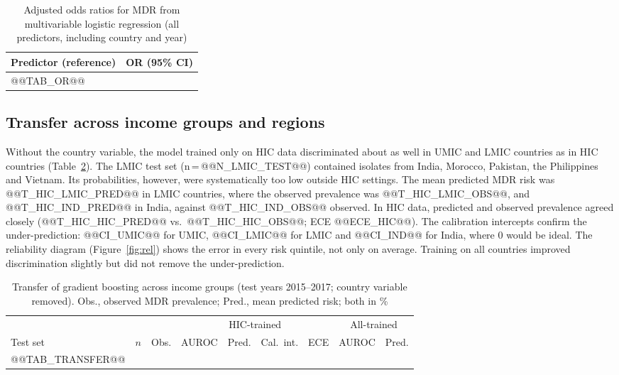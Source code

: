 \documentclass[11pt,a4paper]{article}
\begin{document}
\begin{table}[t]
\caption{Adjusted odds ratios for MDR from multivariable logistic regression (all predictors, including country and year)}\label{tab:or}
\centering\footnotesize
\begin{tabular}{lc}
\toprule
Predictor (reference) & OR (95\% CI) \\
\midrule
@@TAB_OR@@
\bottomrule
\end{tabular}
\end{table}

\subsection{Transfer across income groups and regions}
Without the country variable, the model trained only on HIC data discriminated about as well in UMIC and LMIC countries as in HIC countries (Table~\ref{tab:transfer}). The LMIC test set (n\,=\,@@N_LMIC_TEST@@) contained isolates from India, Morocco, Pakistan, the Philippines and Vietnam. Its probabilities, however, were systematically too low outside HIC settings. The mean predicted MDR risk was @@T_HIC_LMIC_PRED@@ in LMIC countries, where the observed prevalence was @@T_HIC_LMIC_OBS@@, and @@T_HIC_IND_PRED@@ in India, against @@T_HIC_IND_OBS@@ observed. In HIC data, predicted and observed prevalence agreed closely (@@T_HIC_HIC_PRED@@ vs.\ @@T_HIC_HIC_OBS@@; ECE @@ECE_HIC@@). The calibration intercepts confirm the under-prediction: @@CI_UMIC@@ for UMIC, @@CI_LMIC@@ for LMIC and @@CI_IND@@ for India, where 0 would be ideal. The reliability diagram (Figure~\ref{fig:rel}) shows the error in every risk quintile, not only on average. Training on all countries improved discrimination slightly but did not remove the under-prediction.

\begin{table}[t]
\caption{Transfer of gradient boosting across income groups (test years 2015--2017; country variable removed). Obs., observed MDR prevalence; Pred., mean predicted risk; both in \%}\label{tab:transfer}
\centering\footnotesize
\begin{tabular}{lrrcccccc}
\toprule
 & & & \multicolumn{4}{c}{HIC-trained} & \multicolumn{2}{c}{All-trained} \\
\cmidrule(lr){4-7}\cmidrule(lr){8-9}
Test set & $n$ & Obs. & AUROC & Pred. & Cal.\ int. & ECE & AUROC & Pred. \\
\midrule
@@TAB_TRANSFER@@
\bottomrule
\end{tabular}
\end{table}
\end{document}
